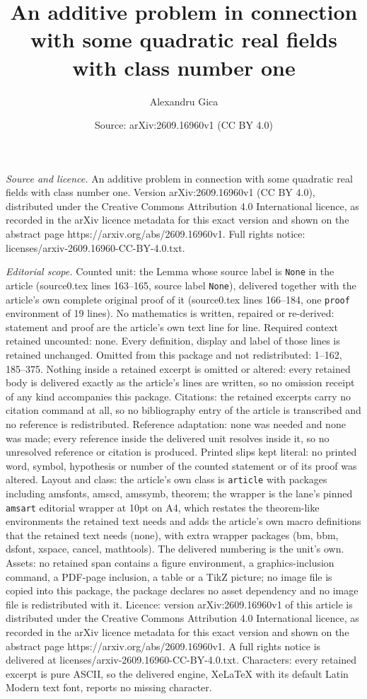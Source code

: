 \documentclass[10pt,a4paper]{amsart}
\title[An additive problem in connection with some quadratic real f]{An additive problem in connection with some quadratic real fields with class number one}
\author{Alexandru Gica}
\date{Source: arXiv:2609.16960v1 (CC BY 4.0)}
\begin{document}
\maketitle

\noindent\emph{Source and licence.} An additive problem in connection with some quadratic real fields with class number one. Version arXiv:2609.16960v1 (CC BY 4.0), distributed under the Creative Commons Attribution 4.0 International licence, as recorded in the arXiv licence metadata for this exact version and shown on the abstract page https://arxiv.org/abs/2609.16960v1. Full rights notice: licenses/arxiv-2609.16960-CC-BY-4.0.txt.\par\smallskip

\noindent\textit{Editorial scope.} Counted unit: the Lemma whose source label is \texttt{None} in the article (source0.tex lines 163--165, source label \texttt{None}), delivered together with the article's own complete original proof of it (source0.tex lines 166--184, one \texttt{proof} environment of 19 lines). No mathematics is written, repaired or re-derived: statement and proof are the article's own text line for line. Required context retained uncounted: none. Every definition, display and label of those lines is retained unchanged. Omitted from this package and not redistributed: 1--162, 185--375. Nothing inside a retained excerpt is omitted or altered: every retained body is delivered exactly as the article's lines are written, so no omission receipt of any kind accompanies this package. Citations: the retained excerpts carry no citation command at all, so no bibliography entry of the article is transcribed and no reference is redistributed. Reference adaptation: none was needed and none was made; every reference inside the delivered unit resolves inside it, so no unresolved reference or citation is produced. Printed slips kept literal: no printed word, symbol, hypothesis or number of the counted statement or of its proof was altered. Layout and class: the article's own class is \texttt{article} with packages including amsfonts, amscd, amssymb, theorem; the wrapper is the lane's pinned \texttt{amsart} editorial wrapper at 10pt on A4, which restates the theorem-like environments the retained text needs and adds the article's own macro definitions that the retained text needs (none), with extra wrapper packages (bm, bbm, dsfont, xspace, cancel, mathtools). The delivered numbering is the unit's own. Assets: no retained span contains a figure environment, a graphics-inclusion command, a PDF-page inclusion, a table or a TikZ picture; no image file is copied into this package, the package declares no asset dependency and no image file is redistributed with it. Licence: version arXiv:2609.16960v1 of this article is distributed under the Creative Commons Attribution 4.0 International licence, as recorded in the arXiv licence metadata for this exact version and shown on the abstract page https://arxiv.org/abs/2609.16960v1. A full rights notice is delivered at licenses/arxiv-2609.16960-CC-BY-4.0.txt. Characters: every retained excerpt is pure ASCII, so the delivered engine, XeLaTeX with its default Latin Modern text font, reports no missing character.
\end{document}
